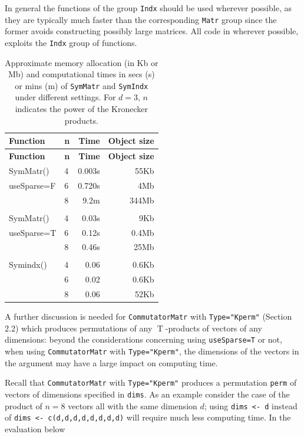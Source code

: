 In general the functions of the group \texttt{Indx} should be used wherever possible, as they are typically much faster than the corresponding \texttt{Matr} group since the former avoids constructing possibly large matrices. All code in  wherever possible, exploits the \texttt{Indx} group of functions.

\begin{longtable}[]{@{}llrr@{}}
\caption{\label{tab:Symmetr} Approximate memory allocation (in Kb or Mb) and computational times in secs (s) or mins (m) of \texttt{SymMatr} and \texttt{SymIndx} under different settings. For \(d=3\), \(n\) indicates the power of the Kronecker products.}\tabularnewline
\toprule\noalign{}
\textbf{Function} & \textbf{n} & \textbf{Time} & \textbf{Object size} \\
\midrule\noalign{}
\endfirsthead
\toprule\noalign{}
\textbf{Function} & \textbf{n} & \textbf{Time} & \textbf{Object size} \\
\midrule\noalign{}
\endhead
\bottomrule\noalign{}
\endlastfoot
SymMatr() & 4 & 0.003s & 55Kb \\
useSparse=F & 6 & 0.720s & 4Mb \\
& 8 & 9.2m & 344Mb \\
& & & \\
SymMatr() & 4 & 0.03s & 9Kb \\
useSparse=T & 6 & 0.12s & 0.4Mb \\
& 8 & 0.46s & 25Mb \\
& & & \\
Symindx() & 4 & 0.06 & 0.6Kb \\
& 6 & 0.02 & 0.6Kb \\
& 8 & 0.06 & 52Kb \\
\end{longtable}

A further discussion is needed for \texttt{CommutatorMatr} with \texttt{Type="Kperm"} (Section 2.2) which produces permutations of any \(\operatorname{T}\)-products of vectors of any dimensions: beyond the considerations concerning using \texttt{useSparse=T} or not, when using \texttt{CommutatorMatr} with \texttt{Type="Kperm"}, the dimensions of the vectors in the argument may have a large impact on computing time.

Recall that \texttt{CommutatorMatr} with \texttt{Type="Kperm"} produces a permutation \texttt{perm} of vectors of dimensions specified in \texttt{dims}. As an example consider the case of the product of \(n=8\) vectors all with the same dimension \(d\); using \texttt{dims\ \textless{}-\ d} instead of \texttt{dims\ \textless{}-\ c(d,d,d,d,d,d,d,d)} will require much less computing time. In the evaluation below

